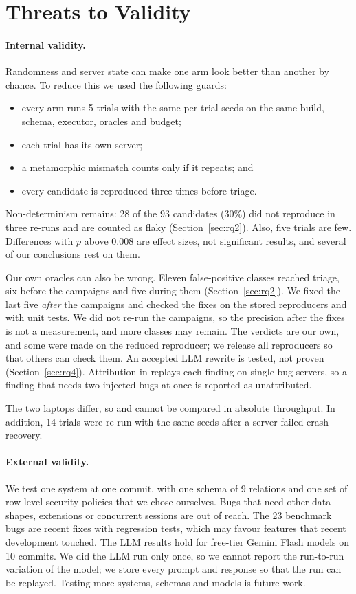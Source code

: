 \section{Threats to Validity}
\label{sec:threats}

\paragraph{Internal validity.} Randomness and server state can make one arm
look better than another by chance. To reduce this we used the following guards:
\begin{itemize}
  \item every arm runs 5 trials with the same per-trial seeds on the same build,
    schema, executor, oracles and budget;
  \item each trial has its own server;
  \item a metamorphic mismatch counts only if it repeats; and
  \item every candidate is reproduced three times before triage.
\end{itemize}
Non-determinism remains: 28 of the 93 candidates (30\%) did not reproduce in
three re-runs and are counted as flaky (Section~\ref{sec:rq2}). Also, five
trials are few. Differences with $p$ above 0.008 are effect sizes,
not significant results, and several of our conclusions rest on them.

Our own oracles can also be wrong. Eleven false-positive classes reached
triage, six before the campaigns and five during them (Section~\ref{sec:rq2}).
We fixed the last five \emph{after} the campaigns and checked the fixes on the
stored reproducers and with unit tests. We did not re-run the campaigns, so the
precision after the fixes is not a measurement, and more classes may remain.
The verdicts are our own, and some were made on the reduced reproducer; we
release all reproducers so that others can check them. An accepted LLM rewrite
is tested, not proven (Section~\ref{sec:rq4}). Attribution in  replays
each finding on single-bug servers, so a finding that needs two injected bugs at
once is reported as unattributed.

The two laptops differ, so  and  cannot be compared in
absolute throughput. In addition, 14  trials were re-run with the same
seeds after a server failed crash recovery.

\paragraph{External validity.} We test one system at one commit, with one schema
of 9 relations and one set of row-level security policies that we chose
ourselves. Bugs that need other data shapes, extensions or concurrent sessions
are out of reach. The 23 benchmark bugs are recent fixes with regression tests,
which may favour features that recent \pg development touched. The LLM results
hold for free-tier Gemini Flash models on 10 commits. We did the LLM run only
once, so we cannot report the run-to-run variation of the model; we store every
prompt and response so that the run can be replayed. Testing more systems,
schemas and models is future work.

